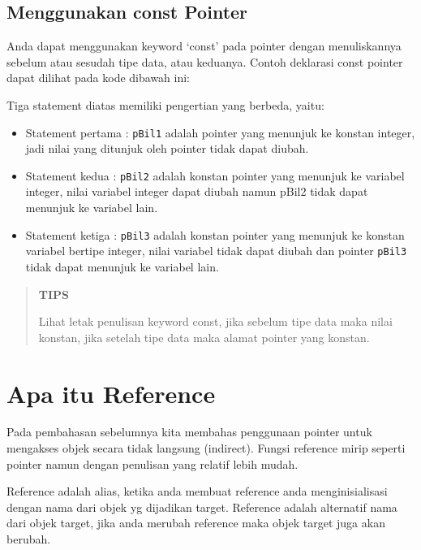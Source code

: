 \subsection{Menggunakan const Pointer}\label{menggunakan-const-pointer}

Anda dapat menggunakan keyword `const' pada pointer dengan menuliskannya
sebelum atau sesudah tipe data, atau keduanya. Contoh deklarasi const
pointer dapat dilihat pada kode dibawah ini:



Tiga statement diatas memiliki pengertian yang berbeda, yaitu:

\begin{itemize}

\item
  Statement pertama : \texttt{pBil1} adalah pointer yang menunjuk ke
  konstan integer, jadi nilai yang ditunjuk oleh pointer tidak dapat
  diubah.
\item
  Statement kedua : \texttt{pBil2} adalah konstan pointer yang menunjuk
  ke variabel integer, nilai variabel integer dapat diubah namun pBil2
  tidak dapat menunjuk ke variabel lain.
\item
  Statement ketiga : \texttt{pBil3} adalah konstan pointer yang menunjuk
  ke konstan variabel bertipe integer, nilai variabel tidak dapat diubah
  dan pointer \texttt{pBil3} tidak dapat menunjuk ke variabel lain.
\end{itemize}

\begin{quotation}
{\LARGE {}} 	\textbf{TIPS}
	
	Lihat
	letak penulisan keyword const, jika sebelum tipe data maka nilai
	konstan, jika setelah tipe data maka alamat pointer yang konstan.
\end{quotation}
 

\section{Apa itu Reference}\label{apa-itu-reference}

Pada pembahasan sebelumnya kita membahas penggunaan pointer untuk
mengakses objek secara tidak langsung (indirect). Fungsi reference mirip
seperti pointer namun dengan penulisan yang relatif lebih mudah.

Reference adalah alias, ketika anda membuat reference anda
menginisialisasi dengan nama dari objek yg dijadikan target. Reference
adalah alternatif nama dari objek target, jika anda merubah reference
maka objek target juga akan berubah.

